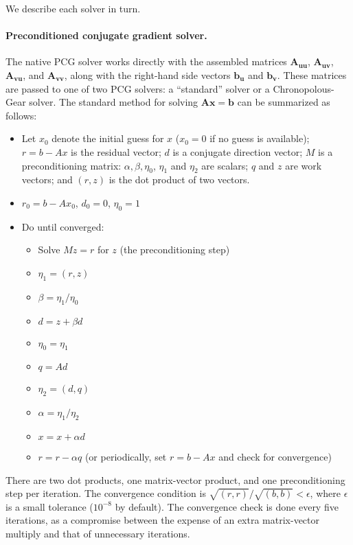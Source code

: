 {We describe each solver in turn.

\paragraph{Preconditioned conjugate gradient solver.}

The native PCG solver works directly with the assembled matrices
$\mathbf{A_{uu}}$, $\mathbf{A_{uv}}$, $\mathbf{A_{vu}}$, and $\mathbf{A_{vv}}$, along with the right-hand side vectors
$\mathbf{b_u}$ and $\mathbf{b_v}$.  These matrices are passed to one of two PCG solvers:
a ``standard'' solver or a Chronopolous-Gear solver.  The standard method 
for solving $\mathbf{Ax} = \mathbf{b}$ can be summarized as follows:

\begin{itemize}

\item Let $x_0$ denote the initial guess for $x$ ($x_0 = 0$ if no guess is available);
$r = b - Ax$ is the residual vector; $d$ is a conjugate direction vector;
$M$ is a preconditioning matrix: $\alpha, \beta, \eta_0$, $\eta_1$ and $\eta_2$ are scalars;
$q$ and $z$ are work vectors; and $(r,z)$ is the dot product of two vectors.

\item $r_0 = b - A x_0$, $d_0 = 0$, $\eta_0 = 1$ 

\item Do until converged:
  \begin{itemize}
\renewcommand{\labelitemii}{$\star$}
  \item Solve $M z = r$ for $z$ (the preconditioning step)
  \item $\eta_1 = (r,z)$
  \item $\beta = \eta_1/\eta_0$
  \item $d = z + \beta d$
  \item $\eta_0 = \eta_1$
  \item $q = A d$
  \item $\eta_2 = (d,q)$
  \item $\alpha = \eta_1/\eta_2$
  \item $x = x + \alpha d$
  \item $r = r - \alpha q$ (or periodically, set $r = b - A x$ and check for convergence)
  \end{itemize}
\end{itemize}

\noindent
There are two dot products, one matrix-vector product, and one preconditioning step per iteration.
The convergence condition is $\sqrt{(r,r)}/\sqrt{(b,b)} < \epsilon$, where $\epsilon$ is a small tolerance
($10^{-8}$ by default).
The convergence check is done every five iterations, as a compromise
between the expense of an extra matrix-vector multiply and that of unnecessary iterations.

}
